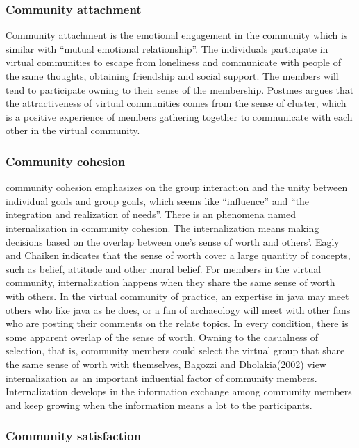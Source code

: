 \documentclass{elsarticle}
\begin{document}
\subsubsection{Community attachment}
\label{sec:community-attachment}

Community attachment is the emotional engagement in the community which is similar with “mutual emotional relationship”. The individuals participate in virtual communities to escape from loneliness and communicate with people of the same thoughts, obtaining friendship and social support. The members will tend to participate owning to their sense of the membership. Postmes argues that the attractiveness of virtual communities comes from the sense of cluster, which is a positive experience of members gathering together to communicate with each other in the virtual community\cite{t_postmes_formation_2000}.     

\subsubsection{Community cohesion}
\label{sec:community-cohesion}

community cohesion emphasizes on the group interaction and the
unity between individual goals and group goals, which seems like
“influence” and “the integration and realization of needs”. There is
an phenomena named internalization in community cohesion. The
internalization means making decisions based on the overlap between
one’s sense of worth and others’. Eagly and Chaiken indicates that the
sense of worth cover a large quantity of concepts, such as belief,
attitude and other moral belief\cite{eagly1993pa}. For members in the virtual
community, internalization happens when they share the same sense of
worth with others. In the virtual community of practice, an expertise
in java may meet others who like java as he does, or a fan of
archaeology will meet with other fans who are posting their comments
on the relate topics. In every condition, there is some apparent
overlap of the sense of worth. Owning to the casualness of selection,
that is, community members could select the virtual group that share
the same sense of worth with themselves, Bagozzi and Dholakia(2002)
view internalization as an important influential factor of community
members\cite{richard_p._bagozzi_intentional_2002}. Internalization develops in the information exchange among
community members and keep growing when the information means a lot to
the participants. 

\subsubsection{Community satisfaction}
\label{sec:comm-satisf}
\end{document}
